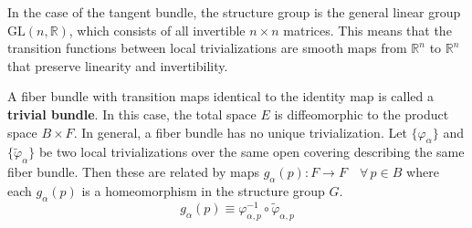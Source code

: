 In the case of the tangent bundle, the structure group is the general linear group $\mathrm{GL}(n, \mathbb{R})$, which consists of all invertible $n \times n$ matrices. This means that the transition functions between local trivializations are smooth maps from $\mathbb{R}^n$ to $\mathbb{R}^n$ that preserve linearity and invertibility.

A fiber bundle with transition maps identical to the identity map is called a \textbf{trivial bundle}. In this case, the total space $E$ is diffeomorphic to the product space $B \times F$.
In general, a fiber bundle has no unique trivialization. Let $\{\varphi_\alpha\}$ and $\{\tilde{\varphi}_\alpha\}$ be two local trivializations over the same open covering describing the same fiber bundle. Then these are related by maps $g_\alpha(p) : F \to F \quad \forall\, p \in B$ where each $g_\alpha(p)$ is a homeomorphism in the structure group $G$.
\[
g_\alpha(p) \equiv \varphi_{\alpha,p}^{-1} \circ \tilde{\varphi}_{\alpha,p}
\]
